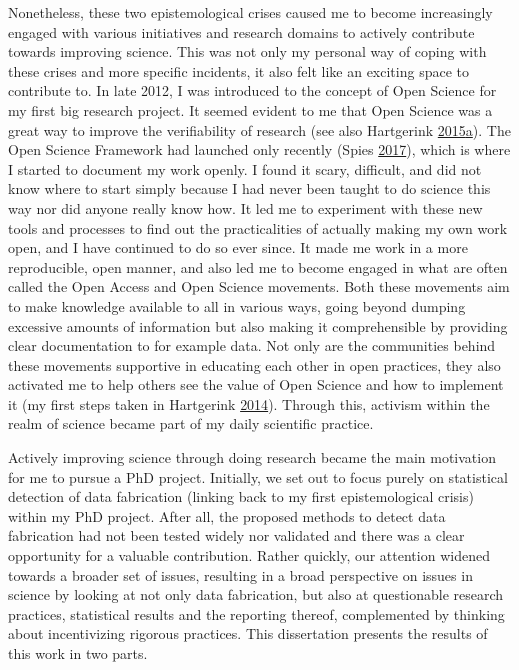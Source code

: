 \documentclass[a5paper]{book}
\begin{document}
Nonetheless, these two epistemological crises caused me to become
increasingly engaged with various initiatives and research domains to
actively contribute towards improving science. This was not only my
personal way of coping with these crises and more specific incidents, it
also felt like an exciting space to contribute to. In late 2012, I was
introduced to the concept of Open Science for my first big research
project. It seemed evident to me that Open Science was a great way to
improve the verifiability of research (see also Hartgerink
\protect\hyperlink{ref-doi:10.15200ux2fwinn.144232.26366}{2015}\protect\hyperlink{ref-doi:10.15200ux2fwinn.144232.26366}{a}).
The Open Science Framework had launched only recently (Spies
\protect\hyperlink{ref-doi:10.31237ux2fosf.ioux2ft23za}{2017}), which is
where I started to document my work openly. I found it scary, difficult,
and did not know where to start simply because I had never been taught
to do science this way nor did anyone really know how. It led me to
experiment with these new tools and processes to find out the
practicalities of actually making my own work open, and I have continued
to do so ever since. It made me work in a more reproducible, open
manner, and also led me to become engaged in what are often called the
Open Access and Open Science movements. Both these movements aim to make
knowledge available to all in various ways, going beyond dumping
excessive amounts of information but also making it comprehensible by
providing clear documentation to for example data. Not only are the
communities behind these movements supportive in educating each other in
open practices, they also activated me to help others see the value of
Open Science and how to implement it (my first steps taken in Hartgerink
\protect\hyperlink{ref-doi:10.6084ux2fm9.figshare.928315.v2}{2014}).
Through this, activism within the realm of science became part of my
daily scientific practice.

Actively improving science through doing research became the main
motivation for me to pursue a PhD project. Initially, we set out to
focus purely on statistical detection of data fabrication (linking back
to my first epistemological crisis) within my PhD project. After all,
the proposed methods to detect data fabrication had not been tested
widely nor validated and there was a clear opportunity for a valuable
contribution. Rather quickly, our attention widened towards a broader
set of issues, resulting in a broad perspective on issues in science by
looking at not only data fabrication, but also at questionable research
practices, statistical results and the reporting thereof, complemented
by thinking about incentivizing rigorous practices. This dissertation
presents the results of this work in two parts.
\end{document}

